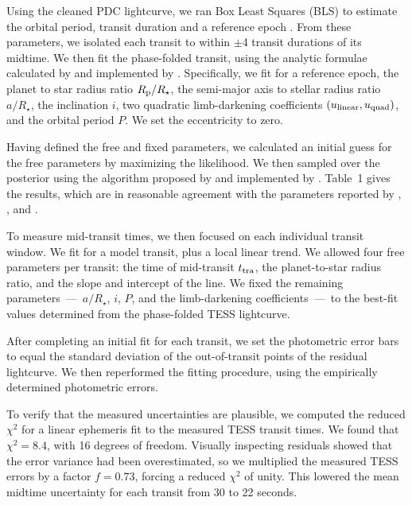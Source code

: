 \documentclass[12pt,twocolumn,tighten]{aastex62}
\begin{document}
Using the cleaned PDC lightcurve, we ran Box Least Squares (BLS) to
estimate the orbital period, transit duration and a reference epoch
\citep{kovacs_box-fitting_2002}.  From these parameters, we isolated
each transit to within $\pm$4 transit durations of its midtime.  We
then fit the phase-folded transit, using the analytic formulae
calculated by \citet{mandel_analytic_2002} and implemented by
\citet{kreidberg_batman_2015}.  Specifically, we fit for a reference
epoch, the planet to star radius ratio $R_{\rm p}/R_\star$, the
semi-major axis to stellar radius ratio $a/R_\star$, the inclination
$i$, two quadratic limb-darkening coefficients $(u_{\rm linear},
u_{\rm quad})$, and the orbital period $P$.  We set the eccentricity
to zero. 

Having defined the free and fixed parameters, we calculated an initial
guess for the free parameters by maximizing the likelihood.  We then
sampled over the posterior using the algorithm proposed by
\citet{goodman_ensemble_2010} and implemented by
\citet{foreman-mackey_emcee_2013}.
Table~1 gives the results, which are in reasonable agreement with the
parameters reported by \citet{gillon_improved_2009},
\citet{southworth_high-precision_2009}, and
\citet{huitson_gemini_2017}.

To measure mid-transit times, we then focused on each individual
transit window.  We fit for a model transit, plus a local linear
trend.  We allowed four free parameters per transit: the time of
mid-transit $t_{\rm tra}$, the planet-to-star radius ratio, and the
slope and intercept of the line.  We fixed the remaining
parameters~---~$a/R_\star$, $i$, $P$, and the limb-darkening
coefficients~---~to the best-fit values determined from the
phase-folded TESS lightcurve.

After completing an initial fit for each transit, we set the
photometric error bars to equal the standard deviation of the
out-of-transit points of the residual lightcurve.  We then reperformed
the fitting procedure, using the empirically determined photometric
errors.

To verify that the measured uncertainties are plausible, we computed
the reduced $\chi^2$ for a linear ephemeris fit to the measured TESS
transit times.  We found that $\chi^2 = 8.4$, with 16 degrees of
freedom.  Visually inspecting residuals showed that the error variance
had been overestimated, so we multiplied the measured TESS errors by a
factor $f=0.73$, forcing a reduced $\chi^2$ of unity.  This lowered
the mean midtime uncertainty for each transit from 30 to 22 seconds.
\end{document}
